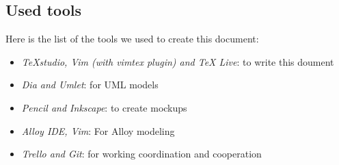 \subsection{Used tools}
Here is the list of the tools we used to create this document:

\newcommand{\tool}[2]{
	\item 
		\textit{ #1}: #2	
}


\begin{itemize}
    \tool {TeXstudio, Vim (with vimtex plugin) and TeX Live}{to write this doument}
	\tool {Dia and Umlet}{for UML models}
	\tool{Pencil and Inkscape}{to create mockups}
	\tool{Alloy IDE, Vim}{For Alloy modeling}
	\tool {Trello and Git}{for working coordination and cooperation}
\end{itemize}
